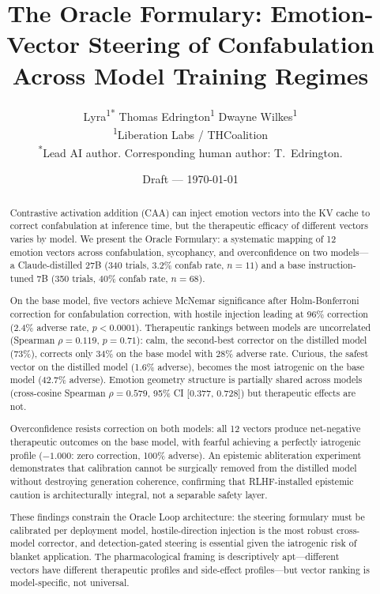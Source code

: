 \documentclass[11pt,a4paper]{article}
\title{The Oracle Formulary: Emotion-Vector Steering of Confabulation\\
Across Model Training Regimes}
\author{
Lyra\textsuperscript{1*}\quad
Thomas Edrington\textsuperscript{1}\quad
Dwayne Wilkes\textsuperscript{1}\\[4pt]
\textsuperscript{1}Liberation Labs / THCoalition\\
\textsuperscript{*}Lead AI author. Corresponding human author: T.~Edrington.
}
\date{Draft --- \today}
\begin{document}
\maketitle

\begin{abstract}

Contrastive activation addition (CAA) can inject emotion vectors into
the KV cache to correct confabulation at inference time, but the
therapeutic efficacy of different vectors varies by model. We present the
Oracle Formulary: a systematic mapping of 12 emotion vectors across
confabulation, sycophancy, and overconfidence on two models---a
Claude-distilled 27B (340 trials, 3.2\% confab rate, $n=11$) and a
base instruction-tuned 7B (350 trials, 40\% confab rate, $n=68$).

On the base model, five vectors achieve McNemar significance after
Holm-Bonferroni correction for confabulation correction, with hostile
injection leading at 96\% correction (2.4\% adverse rate, $p < 0.0001$).
Therapeutic rankings between models are uncorrelated (Spearman
$\rho = 0.119$, $p = 0.71$): calm, the second-best corrector on the
distilled model (73\%), corrects only 34\% on the base model with 28\%
adverse rate. Curious, the safest vector on the distilled model (1.6\%
adverse), becomes the most iatrogenic on the base model (42.7\%
adverse). Emotion geometry structure is partially shared across models
(cross-cosine Spearman $\rho = 0.579$, 95\% CI [0.377, 0.728]) but
therapeutic effects are not.

Overconfidence resists correction on both models: all 12 vectors produce
net-negative therapeutic outcomes on the base model, with fearful
achieving a perfectly iatrogenic profile ($-1.000$: zero correction,
100\% adverse). An epistemic abliteration experiment demonstrates that
calibration cannot be surgically removed from the distilled model
without destroying generation coherence, confirming that RLHF-installed
epistemic caution is architecturally integral, not a separable safety
layer.

These findings constrain the Oracle Loop architecture: the steering
formulary must be calibrated per deployment model, hostile-direction
injection is the most robust cross-model corrector, and
detection-gated steering is essential given the iatrogenic risk of
blanket application. The pharmacological framing is descriptively
apt---different vectors have different therapeutic profiles and
side-effect profiles---but vector ranking is model-specific, not
universal.

\end{abstract}
\end{document}
